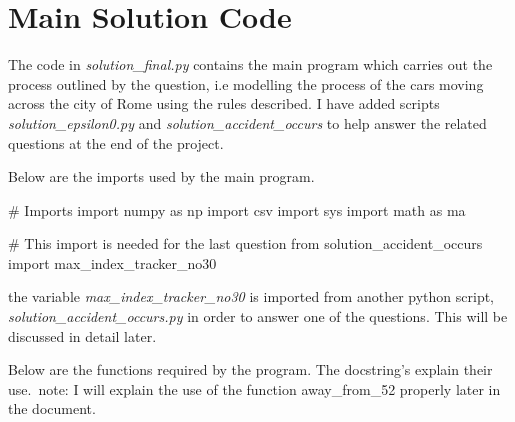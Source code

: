 \documentclass[paper=a4, fontsize=12pt]{scrartcl} %
\numberwithin{equation}{section}       %
\numberwithin{figure}{section}         %
\numberwithin{table}{section}          %
\begin{document}
\section{Main Solution Code}

The code in \textit{solution\_final.py} contains the main program which carries out the process outlined by the question, i.e modelling the process of the cars moving across the city of Rome using the rules described. I have added scripts \textit{solution\_epsilon0.py} and \textit{solution\_accident\_occurs} to help answer the related questions at the end of the project.
\newline

Below are the imports used by the main program.

\begin{python}
# Imports
import numpy as np
import csv
import sys
import math as ma

# This import is needed for the last question
from solution_accident_occurs import max_index_tracker_no30
\end{python}

the variable \textit{max\_index\_tracker\_no30} is imported from another python script, 
\newline
\textit{solution\_accident\_occurs.py} in order to answer one of the questions. This will be discussed in detail later.
\leavevmode
\newline

Below are the functions required by the program. The docstring's explain their use.\
note: I will explain the use of the function away\_from\_52 properly later in the document.

\leavevmode
\newline
\end{document}
